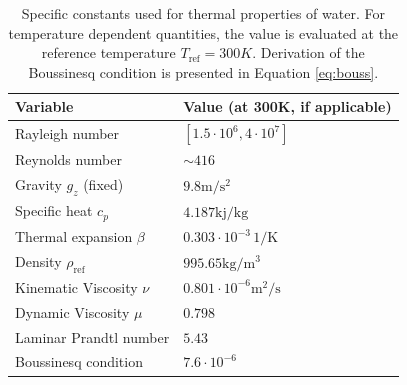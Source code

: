 \documentclass[12pt]{report}
\newcommand{\rhoref}{\rho_{\text{ref}}}
\begin{document}
\begin{table}[h]
\caption[Specific constants used for thermal properties of water]{
  Specific constants used for thermal properties of water.
  For temperature dependent quantities, the value is evaluated at the reference temperature $T_\text{ref}  = 300K$.
  Derivation of the Boussinesq condition is presented in Equation \ref{eq:bouss}.
  }
\begin{center}
\begin{tabular}{ll}
\hline
Variable & Value (at 300K, if applicable)\\
\hline
\hline
Rayleigh number & $[1.5\cdot 10^6, 4\cdot 10^7]$\\
\hline
Reynolds number & $\sim 416$\\
\hline
Gravity $g_z$ (fixed) & $9.8 \text{m}/\text{s}^2$\\
\hline
Specific heat $c_p$ & $4.187 \text{kj}/\text{kg}$\\
\hline
Thermal expansion $\beta$ & $0.303\cdot 10^{-3} \,1/\text{K}$\\
\hline
Density $\rhoref$ & $995.65 \text{kg}/\text{m}^3$\\
\hline
Kinematic Viscosity $\nu$ & $0.801\cdot 10^{-6} \text{m}^2/\text{s}$\\
\hline
Dynamic Viscosity $\mu$ & $0.798$\\
\hline
Laminar Prandtl number & $5.43$\\
\hline
Boussinesq condition & $7.6\cdot 10^{-6}$\\
\hline
\end{tabular}
\label{tb:flowvariables}
\end{center}
\end{table}
\end{document}
